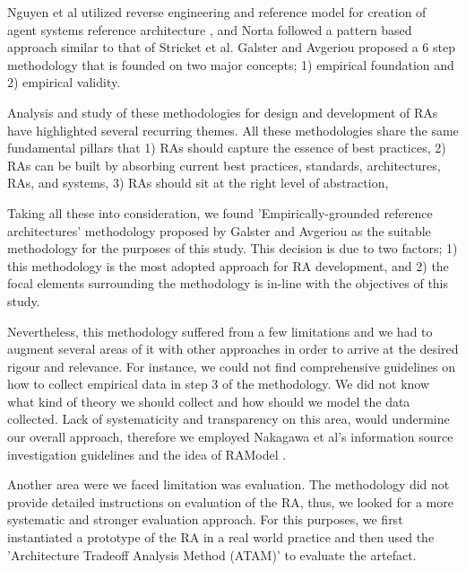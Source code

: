 \documentclass[runningheads]{llncs}
\begin{document}



Nguyen et al utilized reverse engineering and reference model for creation of agent systems reference architecture \cite{nguyen2010methodology}, and Norta \cite{norta2006developing} followed a pattern based approach similar to that of Stricket et al. Galster and Avgeriou \cite{GALSTER} proposed a 6 step methodology that is founded on two major concepts; 1) empirical foundation and 2) empirical validity.

Analysis and study of these methodologies for design and development of RAs have highlighted several recurring themes.
All these methodologies share the same fundamental pillars that 1) RAs should capture the essence of best practices, 2) RAs can be built by absorbing current best practices, standards, architectures, RAs, and systems, 3) RAs should sit at the right level of abstraction,

Taking all these into consideration, we found 'Empirically-grounded reference architectures' methodology proposed by Galster and Avgeriou as the suitable methodology for the purposes of this study. This decision is due to two factors; 1) this methodology is the most adopted approach for RA development, and 2) the focal elements surrounding the methodology is in-line with the objectives of this study. 

Nevertheless, this methodology suffered from a few limitations and we had to augment several areas of it with other approaches in order to arrive at the desired rigour and relevance. For instance, we could not find comprehensive guidelines on how to collect empirical data in step 3 of the methodology. We did not know what kind of theory we should collect and how should we model the data collected. Lack of systematicity and transparency on this area, would undermine our overall approach, therefore we employed Nakagawa et al's information source investigation guidelines and the idea of RAModel \cite{nakagawa2012ramodel}. 

Another area were we faced limitation was evaluation. The methodology did not provide detailed instructions on evaluation of the RA, thus, we looked for a more systematic and stronger evaluation approach. For this purposes, we first instantiated a prototype of the RA in a real world practice and then used the 'Architecture Tradeoff Analysis Method (ATAM)'\cite{KazmanATAM} to evaluate the artefact.
\end{document}
